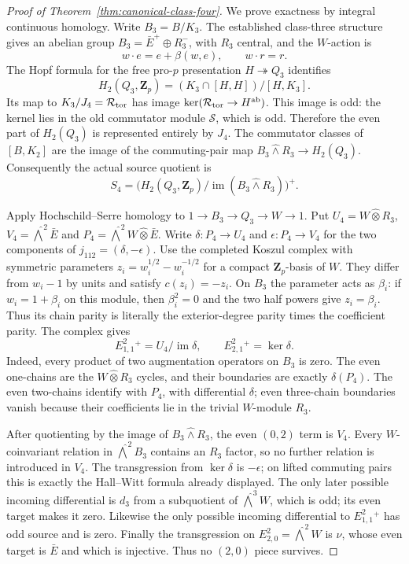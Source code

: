 \documentclass[11pt]{article}
\theoremstyle{definition}\newtheorem{definition}[theorem]{Definition}
\begin{document}
\begin{proof}[Proof of Theorem~\ref{thm:canonical-class-four}]
We prove exactness by integral continuous homology.
Write $B_3=B/K_3$. The established class-three structure
gives an abelian group
$B_3=\bar E^+\oplus R_3^-$, with $R_3$ central, and
the $W$-action is
\[
 w\cdot e=e+\beta(w,e),\qquad w\cdot r=r.
\]
The Hopf formula for the free pro-$p$ presentation
$H\twoheadrightarrow Q_3$ identifies
\[
 H_2(Q_3,\mathbf Z_p)
             =(K_3\cap[H,H])/[H,K_3].
\]
Its map to $K_3/J_4=\mathcal R_{\rm tor}$ has image
$\ker(\mathcal R_{\rm tor}\to H^{\rm ab})$. This image is odd:
the kernel lies in the old commutator module $\mathcal S$,
which is odd. Therefore the even part of $H_2(Q_3)$
is represented entirely by $J_4$. The commutator
classes of $[B,K_2]$ are the image of the commuting-pair
map $B_3\widehat\wedge R_3\to H_2(Q_3)$.
Consequently the actual source quotient is
\begin{equation}\label{eq:class4-Hopf}
 S_4=\bigl(H_2(Q_3,\mathbf Z_p)/
             \operatorname{im}(B_3\widehat\wedge R_3)\bigr)^+.
\end{equation}

Apply Hochschild--Serre homology to
$1\to B_3\to Q_3\to W\to1$.
Put $U_4=W\widehat\otimes R_3$,
$V_4=\widehat\bigwedge^2\bar E$ and
$P_4=\widehat\bigwedge^2W\widehat\otimes\bar E$.
Write $\delta:P_4\to U_4$ and $\epsilon:P_4\to V_4$
for the two components of $j_{112}=(\delta,-\epsilon)$.
Use the completed Koszul complex with symmetric
parameters $z_i=w_i^{1/2}-w_i^{-1/2}$ for a compact
$\mathbf Z_p$-basis of $W$. They differ from $w_i-1$
by units and satisfy $c(z_i)=-z_i$. On $B_3$ the
parameter acts as $\beta_i$: if $w_i=1+\beta_i$ on
this module, then $\beta_i^2=0$ and the two half powers
give $z_i=\beta_i$. Thus its chain parity is literally
the exterior-degree parity times the coefficient
parity. The complex gives
\[
 E^2_{1,1}{}^+=U_4/\operatorname{im}\delta,
 \qquad E^2_{2,1}{}^+=\ker\delta.
\]
Indeed, every product of two augmentation operators
on $B_3$ is zero. The even one-chains are the
$W\widehat\otimes R_3$ cycles, and their boundaries
are exactly $\delta(P_4)$. The even two-chains identify
with $P_4$, with differential $\delta$; even three-chain
boundaries vanish because their coefficients lie in
the trivial $W$-module $R_3$.

After quotienting by the image of
$B_3\widehat\wedge R_3$, the even $(0,2)$ term is
$V_4$. Every $W$-coinvariant relation in
$\widehat\bigwedge^2B_3$ contains an $R_3$ factor,
so no further relation is introduced in $V_4$.
The transgression from $\ker\delta$ is $-\epsilon$;
on lifted commuting pairs this is exactly the
Hall--Witt formula already displayed. The only later
possible incoming differential is $d_3$ from a
subquotient of $\widehat\bigwedge^3W$, which is odd;
its even target makes it zero. Likewise the only
possible incoming differential to $E^2_{1,1}{}^+$
has odd source and is zero. Finally the transgression
on $E^2_{2,0}=\widehat\bigwedge^2W$ is $\nu$, whose
even target is $\bar E$ and which is injective.
Thus no $(2,0)$ piece survives.


\end{proof}
\end{document}
